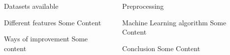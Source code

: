 \documentclass{beamer}
\newlength\postercolumnwidth
\newlength\totalwidth
\begin{document}
\begin{frame}[t]{}
\begin{columns}[totalwidth=\totalwidth]
\begin{column}[t]{\postercolumnwidth}
\begin{block}{Datasets available}
    \end{block}
% 
 \begin{block}{Different features}
     Some Content
    \end{block}
  \begin{block}{Ways of improvement}
    Some content
    \end{block}
  \end{column}
  \begin{column}[t]{\postercolumnwidth}
    \centering
     \begin{block}{Preprocessing}
     
    \end{block}


    \begin{block}{Machine Learning algorithm}
      Some Content
    \end{block} 

    \begin{block}{Conclusion}
      Some Content
    \end{block}
  \end{column}
 \end{columns}

\end{frame}
\end{document}
